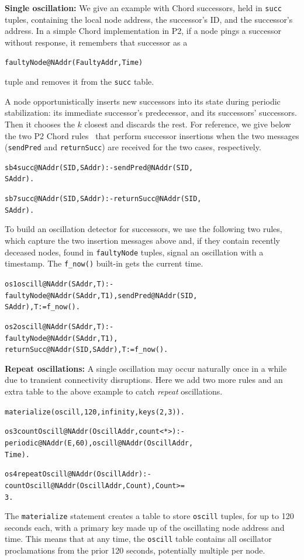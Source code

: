 \documentclass{sig-alt-full}
\renewcommand{\paragraph}[1]{{\bf #1:}}
\newenvironment{overlog}{\begin{alltt}\footnotesize}{\end{alltt}}
\newcommand{\ol}[1]{{\tt\footnotesize#1}}
\begin{document}
\paragraph{Single oscillation}
We give an example with Chord successors, held in \ol{succ} tuples,
containing the local node address, the successor's ID, and the
successor's address.  In a simple
Chord implementation in P2, if a node pings a successor
without response, it remembers that successor as a
\begin{overlog}
faultyNode@NAddr(FaultyAddr, Time)
\end{overlog}
tuple and removes it from the \ol{succ} table.

A node opportunistically inserts new successors into its state
during periodic stabilization: its immediate
successor's predecessor, and its successors' successors.  Then it
chooses the $k$ closest and discards the rest.   For reference, we give
below the two P2 Chord rules~\cite{Loo2005SOSP} that perform successor insertions when the two
messages (\ol{sendPred} and \ol{returnSucc}) are received for the two
cases, respectively.
\begin{overlog}
sb4 succ@NAddr(SID, SAddr) :- sendPred@NAddr(SID,
   SAddr).

sb7 succ@NAddr(SID, SAddr) :- returnSucc@NAddr(SID,
   SAddr).
\end{overlog}
To build an oscillation detector for successors, we use the following
two rules, which capture the two insertion messages above and, if they contain
recently deceased nodes, found in \ol{faultyNode}
tuples, signal an oscillation with a timestamp.  The
\ol{f\_now()} built-in gets the current time.
\begin{overlog}
os1 oscill@NAddr(SAddr, T) :-
   faultyNode@NAddr(SAddr, T1), sendPred@NAddr(SID,
   SAddr), T := f_now().

os2 oscill@NAddr(SAddr, T) :-
   faultyNode@NAddr(SAddr, T1),
   returnSucc@NAddr(SID, SAddr), T := f_now().
\end{overlog}


\paragraph{Repeat oscillations}
A single oscillation may occur naturally once in a while
due to transient connectivity disruptions.  Here we add
two more rules and an extra table to the above example
to catch \emph{repeat} oscillations.
\begin{overlog}
materialize(oscill, 120, infinity, keys(2,3)).

os3 countOscill@NAddr(OscillAddr, count<*>) :-
   periodic@NAddr(E, 60), oscill@NAddr(OscillAddr,
   Time).

os4 repeatOscill@NAddr(OscillAddr) :-
   countOscill@NAddr(OscillAddr, Count), Count >=
   3.
\end{overlog}
The \ol{materialize} statement creates a table to store
\ol{oscill} tuples, for up to 120 seconds each, with a
primary key made up of the oscillating node address and
time.  This means that at any time, the \ol{oscill}
table contains all oscillator proclamations from the
prior 120 seconds, potentially multiple per node.
\end{document}
